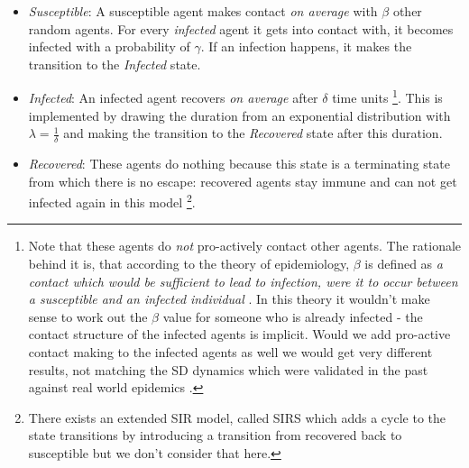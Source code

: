 \begin{itemize}
	\item \textit{Susceptible}: A susceptible agent makes contact \textit{on average} with $\beta$ other random agents. For every \textit{infected} agent it gets into contact with, it becomes infected with a probability of $\gamma$. If an infection happens, it makes the transition to the \textit{Infected} state.

	\item \textit{Infected}: An infected agent recovers \textit{on average} after $\delta$ time units \footnote{Note that these agents do \textit{not} pro-actively contact other agents. The rationale behind it is, that according to the theory of epidemiology, $\beta$ is defined as \textit{a contact which would be sufficient to lead to infection, were it to occur between a susceptible and an infected individual} \cite{abbey_examination_1952}. In this theory it wouldn't make sense to work out the $\beta$ value for someone who is already infected - the contact structure of the infected agents is implicit. Would we add pro-active contact making to the infected agents as well we would get very different results, not matching the SD dynamics which were validated in the past against real world epidemics \cite{ahmed_variance_2013}.}. This is implemented by drawing the duration from an exponential distribution \cite{borshchev_system_2004} with $\lambda = \frac{1}{\delta}$ and making the transition to the \textit{Recovered} state after this duration.

	\item \textit{Recovered}: These agents do nothing because this state is a terminating state from which there is no escape: recovered agents stay immune and can not get infected again in this model \footnote{There exists an extended SIR model, called SIRS which adds a cycle to the state transitions by introducing a transition from recovered back to susceptible but we don't consider that here.}.
\end{itemize}

